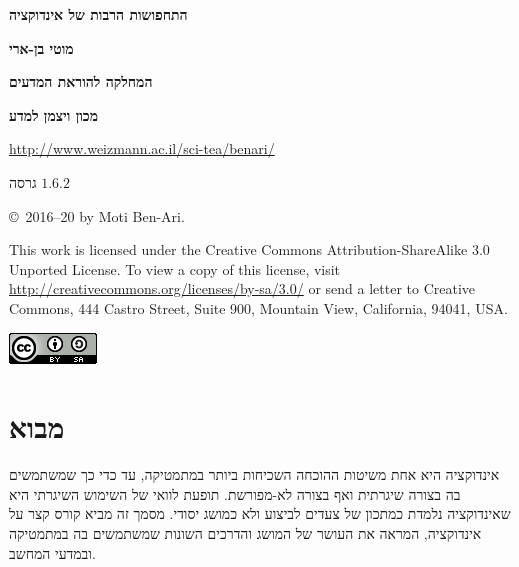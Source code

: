 
\thispagestyle{empty}

\begin{center}
\textbf{\LARGE התחפושות הרבות של אינדוקציה}

\bigskip
\bigskip

\textbf{\Large מוטי בן-ארי}

\bigskip

\textbf{\large המחלקה להוראת המדעים}

\smallskip

\textbf{\large מכון ויצמן למדע}

\bigskip

\url{http://www.weizmann.ac.il/sci-tea/benari/}

\bigskip

\large{גרסה
$1.6.2$}
\end{center}

\vfill

\begin{center}
\copyright{}\  2016--20 by Moti Ben-Ari.
\end{center}

This work is licensed under the Creative Commons Attribution-ShareAlike 3.0 Unported License. To view a copy of this license, visit \url{http://creativecommons.org/licenses/by-sa/3.0/} or send a letter to Creative Commons, 444 Castro Street, Suite 900, Mountain View, California, 94041, USA.

\begin{center}
\includegraphics[width=.2\textwidth]{../../by-sa.png}
\end{center}


\setcounter{tocdepth}{0}
\tableofcontents


\chapter[מבוא]{\vspace*{-2ex}מבוא}\label{s.intro}

\vspace*{-4ex}

אינדוקציה היא אחת משיטות ההוכחה השכיחות ביותר במתמטיקה, עד כדי כך שמשתמשים בה בצורה שיגרתית ואף בצורה לא-מפורשת. תופעת לוואי של השימוש השיגרתי היא שאינדוקציה נלמדת כמתכון של צעדים לביצוע ולא כמושג יסודי. מסמך זה מביא קורס קצר על אינדוקציה, המראה את העושר של המושג והדרכים השונות שמשתמשים בה במתמטיקה ובמדעי המחשב.

